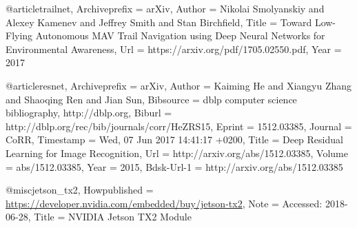 

@article{trailnet,
	Archiveprefix = {arXiv},
	Author = {Nikolai Smolyanskiy and Alexey Kamenev and Jeffrey Smith and Stan Birchfield},
	Title = {Toward Low-Flying Autonomous MAV Trail Navigation using Deep Neural Networks for Environmental Awareness},
	Url = {https://arxiv.org/pdf/1705.02550.pdf},
	Year = {2017}
	}

@article{resnet,
	Archiveprefix = {arXiv},
	Author = {Kaiming He and Xiangyu Zhang and Shaoqing Ren and Jian Sun},
	Bibsource = {dblp computer science bibliography, http://dblp.org},
	Biburl = {http://dblp.org/rec/bib/journals/corr/HeZRS15},
	Eprint = {1512.03385},
	Journal = {CoRR},
	Timestamp = {Wed, 07 Jun 2017 14:41:17 +0200},
	Title = {Deep Residual Learning for Image Recognition},
	Url = {http://arxiv.org/abs/1512.03385},
	Volume = {abs/1512.03385},
	Year = {2015},
	Bdsk-Url-1 = {http://arxiv.org/abs/1512.03385}}

@misc{jetson_tx2,
	Howpublished = {\url{https://developer.nvidia.com/embedded/buy/jetson-tx2}},
	Note = {{A}ccessed: 2018-06-28},
	Title = {NVIDIA Jetson TX2 Module}}

	